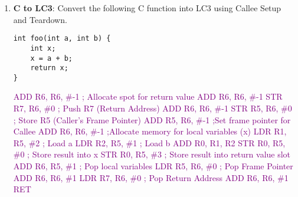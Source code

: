 \documentclass{article}
\begin{document}
\begin{enumerate}[label=(\alph*)]
\item \textbf{C to LC3}: Convert the following C function into LC3 using Callee Setup and Teardown.
    \begin{lstlisting}[style=CStyle] 
int foo(int a, int b) {
    int x;
    x = a + b;
    return x;
}\end{lstlisting}
    \textcolor{purple}{
    ADD R6, R6, \#-1 \hfill ; Allocate spot for return value\newline
    ADD R6, R6, \#-1  \newline
    STR R7, R6, \#0    \hfill ; Push R7 (Return Address) \newline
    ADD R6, R6, \#-1  \newline
    STR R5, R6, \#0    \hfill ; Store R5 (Caller's Frame Pointer) \newline
    ADD R5, R6, \#-1 \hfill ;Set frame pointer for Callee \newline
    ADD R6, R6, \#-1 \hfill ;Allocate memory for local variables (x) \newline
    LDR R1, R5, \#2 \hfill ; Load a \newline 
    LDR R2, R5, \#1 \hfill ; Load b\newline
    ADD R0, R1, R2 \newline 
    STR R0, R5, \#0 \hfill ; Store result into x \newline
    STR R0, R5, \#3 \hfill ; Store result into return value slot \newline
    ADD R6, R5, \#1 \hfill ; Pop local variables\newline
    LDR R5, R6, \#0 \hfill ; Pop Frame Pointer\newline
    ADD R6, R6, \#1 \newline
    LDR R7, R6, \#0 \hfill ; Pop Return Address\newline
    ADD R6, R6, \#1 \newline
    RET
    \newline
}

    
\end{enumerate} 
\end{document}

